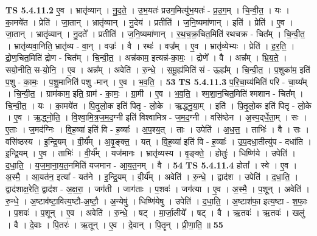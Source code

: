 \documentclass[17pt]{extarticle}
\begin{document}
                  \newline
                                \textbf{ TS 5.4.11.2} \newline
                  ए॒व । भ्रातृ॑व्यान् । नु॒द॒ते॒ । उ॒भ॒यतः॑ प्र‌उग॒मित्यु॑भ॒यतः॑ - प्र॒उ॒ग॒म् । चि॒न्वी॒त॒ । यः । का॒मये॑त । प्रेति॑ । जा॒तान् । भ्रातृ॑व्यान् । नु॒देय॑ । प्रतीति॑ । ज॒नि॒ष्यमा॑णान् । इति॑ । प्रेति॑ । ए॒व । जा॒तान् । भ्रातृ॑व्यान् । नु॒दते᳚ । प्रतीति॑ । ज॒नि॒ष्यमा॑णान् । र॒थ॒च॒क्र॒चित॒मिति॑ रथचक्र - चित᳚म् । चि॒न्वी॒त॒ । भ्रातृ॑व्यवा॒निति॒ भ्रातृ॑व्य - वा॒न् । वज्रः॑ । वै । रथः॑ । वज्र᳚म् । ए॒व । भ्रातृ॑व्येभ्यः । प्रेति॑ । ह॒र॒ति॒ । द्रो॒ण॒चित॒मिति॑ द्रोण - चित᳚म् । चि॒न्वी॒त॒ । अन्न॑काम॒ इत्यन्न॑-का॒मः॒ । द्रोणे᳚ । वै । अन्न᳚म् । भ्रि॒य॒ते॒ । सयो॒नीति॒ स-यो॒नि॒ । ए॒व । अन्न᳚म् । अवेति॑ । रु॒न्धे॒ । स॒मू॒ह्य॑मिति॑ सं - ऊ॒ह्य᳚म् । चि॒न्वी॒त॒ । प॒शुका॑म॒ इति॑ प॒शु - का॒मः॒ । प॒शु॒मानिति॑ पशु -मान् । ए॒व । भ॒व॒ति॒ । \textbf{  53} \newline
                  \newline
                                \textbf{ TS 5.4.11.3} \newline
                  प॒रि॒चा॒य्य॑मिति॑ परि - चा॒य्य᳚म् । चि॒न्वी॒त॒ । ग्राम॑काम॒ इति॒ ग्राम॑ - का॒मः॒ । ग्रा॒मी । ए॒व । भ॒व॒ति॒ । श्म॒शा॒न॒चित॒मिति॑ श्मशान - चित᳚म् । चि॒न्वी॒त॒ । यः । का॒मये॑त । पि॒तृ॒लो॒क इति॑ पितृ - लो॒के । ऋ॒द्ध्नु॒या॒म् । इति॑ । पि॒तृ॒लो॒क इति॑ पितृ - लो॒के । ए॒व । ऋ॒द्ध्नो॒ति॒ । वि॒श्वा॒मि॒त्र॒ज॒म॒द॒ग्नी इति॑ विश्वामित्र - ज॒म॒द॒ग्नी । वसि॑ष्ठेन । अ॒स्प॒द्‌र्धे॒ता॒म् । सः । ए॒ताः । ज॒मद॑ग्निः । वि॒ह॒व्या॑ इति॑ वि - ह॒व्याः᳚ । अ॒प॒श्य॒त् । ताः । उपेति॑ । अ॒ध॒त्त॒ । ताभिः॑ । वै । सः । वसि॑ष्ठस्य । इ॒न्द्रि॒यम् । वी॒र्य᳚म् । अ॒वृ॒ङ्क्त॒ । यत् । वि॒ह॒व्या॑ इति॑ वि - ह॒व्याः᳚ । उ॒प॒दधा॒तीत्यु॑प - दधा॑ति । इ॒न्द्रि॒यम् । ए॒व । ताभिः॑ । वी॒र्य᳚म् । यज॑मानः । भ्रातृ॑व्यस्य । वृ॒ङ्क्ते॒ । होतुः॑ । धिष्णि॑ये । उपेति॑ । द॒धा॒ति॒ । य॒ज॒मा॒ना॒य॒त॒नमिति॑ यजमान - आ॒य॒त॒नम् । वै । \textbf{  54} \newline
                  \newline
                                \textbf{ TS 5.4.11.4} \newline
                  होता᳚ । स्वे । ए॒व । अ॒स्मै॒ । आ॒यत॑न॒ इत्या᳚ - यत॑ने । इ॒न्द्रि॒यम् । वी॒र्य᳚म् । अवेति॑ । रु॒न्धे॒ । द्वाद॑श । उपेति॑ । द॒धा॒ति॒ । द्वाद॑शाक्ष॒रेति॒ द्वाद॑श - अ॒क्ष॒रा॒ । जग॑ती । जाग॑ताः । प॒शवः॑ । जग॑त्या । ए॒व । अ॒स्मै॒ । प॒शून् । अवेति॑ । रु॒न्धे॒ । अ॒ष्टाव॑ष्टा॒वित्य॒ष्टौ-अ॒ष्टौ॒ । अ॒न्येषु॑ । धिष्णि॑येषु । उपेति॑ । द॒धा॒ति॒ । अ॒ष्टाश॑फा॒ इत्य॒ष्टा - श॒फाः॒ । प॒शवः॑ । प॒शून् । ए॒व । अवेति॑ । रु॒न्धे॒ । षट् । मा॒र्जा॒लीये᳚ । षट् । वै । ऋ॒तवः॑ । ऋ॒तवः॑ । खलु॑ । वै । दे॒वाः । पि॒तरः॑ । ऋ॒तून् । ए॒व । दे॒वान् । पि॒तॄन् । प्री॒णा॒ति॒ ॥ \textbf{  55} \newline
\end{document}

